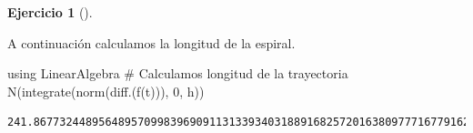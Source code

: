 \documentclass[
  a4paper,
]{scrreport}
\newenvironment{Shaded}{\begin{snugshade}}{\end{snugshade}}
\newcommand{\BuiltInTok}[1]{\textcolor[rgb]{0.00,0.23,0.31}{#1}}
\newcommand{\CommentTok}[1]{\textcolor[rgb]{0.37,0.37,0.37}{#1}}
\newcommand{\FloatTok}[1]{\textcolor[rgb]{0.68,0.00,0.00}{#1}}
\newcommand{\FunctionTok}[1]{\textcolor[rgb]{0.28,0.35,0.67}{#1}}
\newcommand{\ImportTok}[1]{\textcolor[rgb]{0.00,0.46,0.62}{#1}}
\newcommand{\NormalTok}[1]{\textcolor[rgb]{0.00,0.23,0.31}{#1}}
\theoremstyle{definition}
\newtheorem{exercise}{Ejercicio}[chapter]
\theoremstyle{remark}
\begin{document}
\begin{exercise}[]
\begin{tcolorbox}
\begin{figure}[H]
{}

\end{figure}

A continuación calculamos la longitud de la espiral.

\begin{Shaded}
\begin{Highlighting}[]
\ImportTok{using} \BuiltInTok{LinearAlgebra}
\CommentTok{\# Calculamos longitud de la trayectoria}
\FunctionTok{N}\NormalTok{(}\FunctionTok{integrate}\NormalTok{(}\FunctionTok{norm}\NormalTok{(}\FunctionTok{diff}\NormalTok{.(}\FunctionTok{f}\NormalTok{(t))), }\FloatTok{0}\NormalTok{, h))}
\end{Highlighting}
\end{Shaded}

\begin{verbatim}
241.8677324489564895709983969091131339340318891682572016380977716779162485307713
\end{verbatim}

\end{tcolorbox}

\end{exercise}
\end{document}
